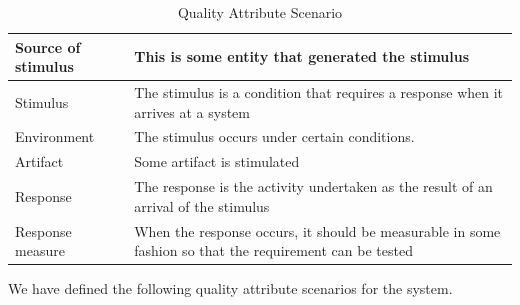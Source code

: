 \documentclass[conference]{IEEEtran}
\begin{document}
\begin{table}[h]
    \centering
    \caption{Quality Attribute Scenario}
    \begin{tabular}{|l|p{4cm}|} \hline
        Source of stimulus & This is some entity that generated the stimulus  \\ \hline
        
        Stimulus & The stimulus is a condition that requires a response when it arrives at a system\\ \hline
        
        Environment & The stimulus occurs under certain conditions.\\ \hline
        
        Artifact  & Some artifact is stimulated\\ \hline

        Response  & The response is the activity undertaken as the result of an arrival of the stimulus\\ \hline

        Response measure & When the response occurs, it should be measurable in some fashion so that the requirement can be tested \\
        \hline
    \end{tabular}
    
    \label{tab:placeholder}
\end{table}


We have defined the following quality attribute scenarios for the system.
\end{document}
